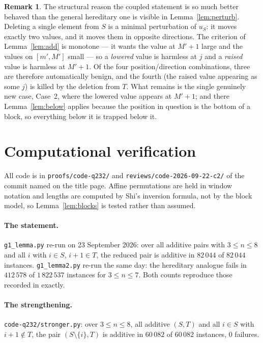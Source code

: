 \documentclass[11pt]{article}
\theoremstyle{definition}
\newtheorem{rem}[thm]{Remark}
\begin{document}
\begin{rem}
The structural reason the coupled statement is so much better behaved than the general
hereditary one is visible in Lemma~\ref{lem:perturb}. Deleting a single element from $S$ is a
minimal perturbation of $u_S$: it moves exactly two values, and it moves them in opposite
directions. The criterion of Lemma~\ref{lem:add} is monotone --- it wants the value at $M'+1$
large and the values on $[m',M']$ small --- so a \emph{lowered} value is harmless at $j$ and a
\emph{raised} value is harmless at $M'+1$. Of the four position/direction combinations, three
are therefore automatically benign, and the fourth (the raised value appearing as some $j$) is
killed by the deletion from $T$. What remains is the single genuinely new case, Case~2, where
the lowered value appears at $M'+1$; and there Lemma~\ref{lem:below} applies because the
position in question is the bottom of a block, so everything below it is trapped below it.
\end{rem}

\section{Computational verification}\label{sec:verify}

All code is in \texttt{proofs/code-q232/} and
\texttt{reviews/code-2026-09-22-c2/} of the commit named on the title page. Affine
permutations are held in window notation and lengths are computed by Shi's inversion formula,
not by the block model, so Lemma~\ref{lem:blocks} is tested rather than assumed.

\paragraph{The statement.} \texttt{g1\_lemma.py} re-run on 23 September 2026: over all additive
pairs with $3\le n\le8$ and all $i$ with $i\in S$, $i+1\in T$, the reduced pair is additive in
$82\,044$ of $82\,044$ instances. \texttt{g1\_lemma2.py} re-run the same day: the hereditary
analogue fails in $412\,578$ of $1\,822\,537$ instances for $3\le n\le7$. Both counts
reproduce those recorded in \cite[\S Gaps, (G1)]{Clio3} exactly.

\paragraph{The strengthening.} \texttt{code-q232/stronger.py}: over $3\le n\le8$, all additive
$(S,T)$ and all $i\in S$ with $i+1\notin T$, the pair $(S\setminus\{i\},T)$ is additive in
$60\,082$ of $60\,082$ instances, $0$ failures.
\end{document}
